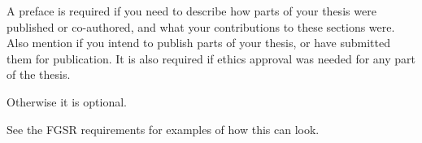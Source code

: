 \documentclass[\main/thesis.tex]{subfiles}
\begin{document}
\begin{preface}


A preface is required if you need to describe how parts of your thesis were
published or co-authored, and what your contributions to these sections were.
Also mention if you intend to publish parts of your thesis,
or have submitted them for publication.
It is also required if ethics approval was needed for any part of the thesis.

Otherwise it is optional.

See the FGSR requirements for examples of how this can look.
\end{preface}
\end{document}
